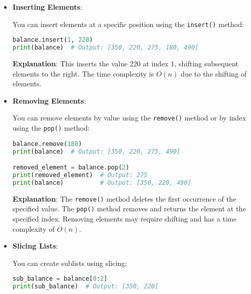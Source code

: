 \begin{itemize}
    \item \textbf{Inserting Elements}:

    You can insert elements at a specific position using the \texttt{insert()} method:

    \begin{fullwidth}
    \begin{lstlisting}[language=Python, caption=Inserting elements into a list]
balance.insert(1, 220)
print(balance)  # Output: [350, 220, 275, 180, 490]
    \end{lstlisting}
    \end{fullwidth}

    \textbf{Explanation}: This inserts the value 220 at index 1, shifting subsequent elements to the right. The time complexity is \(O(n)\) due to the shifting of elements.

    \item \textbf{Removing Elements}:

    You can remove elements by value using the \texttt{remove()} method or by index using the \texttt{pop()} method:

    \begin{fullwidth}
    \begin{lstlisting}[language=Python, caption=Removing elements from a list]
balance.remove(180)
print(balance)  # Output: [350, 220, 275, 490]

removed_element = balance.pop(2)
print(removed_element)  # Output: 275
print(balance)          # Output: [350, 220, 490]
    \end{lstlisting}
    \end{fullwidth}

    \textbf{Explanation}: The \texttt{remove()} method deletes the first occurrence of the specified value. The \texttt{pop()} method removes and returns the element at the specified index. Removing elements may require shifting and has a time complexity of \(O(n)\).

    \item \textbf{Slicing Lists}:

    You can create sublists using slicing:

    \begin{fullwidth}
    \begin{lstlisting}[language=Python, caption=Slicing a list]
sub_balance = balance[0:2]
print(sub_balance)  # Output: [350, 220]
    \end{lstlisting}
    \end{fullwidth}


\end{itemize}
